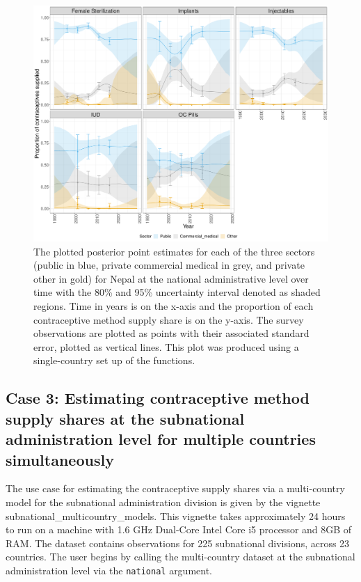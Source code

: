 \begin{figure}[H]
\includegraphics[width=1\linewidth,height=0.4\textheight]{figures/fig_4} \caption{The plotted posterior point estimates for each of the three sectors (public in blue, private commercial medical in grey, and private other in gold) for Nepal at the national administrative level over time with the 80\% and 95\% uncertainty interval denoted as shaded regions. Time in years is on the x-axis and the proportion of each contraceptive method supply share is on the y-axis. The survey observations are plotted as points with their associated standard error, plotted as vertical lines. This plot was produced using a single-country set up of the  functions.}\label{fig:fig-4}
\end{figure}

\subsection{Case 3: Estimating contraceptive method supply shares at the subnational administration level for multiple countries simultaneously}\label{case-3-estimating-contraceptive-method-supply-shares-at-the-subnational-administration-level-for-multiple-countries-simultaneously}

The use case for estimating the contraceptive supply shares via a multi-country model for the subnational administration division is given by the vignette subnational\_multicountry\_models. This vignette takes approximately 24 hours to run on a machine with 1.6 GHz Dual-Core Intel Core i5 processor and 8GB of RAM. The dataset contains observations for 225 subnational divisions, across 23 countries. The user begins by calling the multi-country dataset at the subnational administration level via the \texttt{national} argument.

